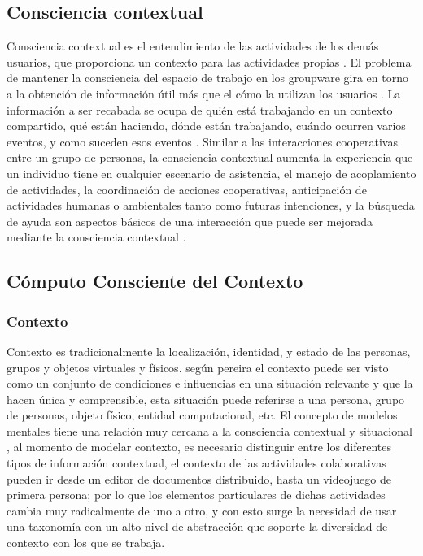 \subsection{Consciencia contextual}
Consciencia contextual es el entendimiento de las actividades de los dem\'as usuarios, que proporciona un contexto para las actividades propias \cite{dourish1992awareness}. El problema de mantener la consciencia del espacio de trabajo en los groupware gira en torno a la obtenci\'on de informaci\'on \'util m\'as que el c\'omo la utilizan los usuarios \cite{ardissono2012context}. La informaci\'on a ser recabada se ocupa de qui\'en est\'a trabajando en un contexto compartido, qu\'e est\'an haciendo, d\'onde est\'an trabajando, cu\'ando ocurren varios eventos, y como suceden esos eventos \cite{ardissono2012context}. Similar a las interacciones cooperativas entre un grupo de personas, la consciencia contextual aumenta la experiencia que un individuo tiene en cualquier escenario de asistencia, el manejo de acoplamiento de actividades, la coordinaci\'on de acciones cooperativas, anticipaci\'on de actividades humanas o ambientales tanto como futuras intenciones, y la b\'usqueda de ayuda son aspectos b\'asicos de una interacci\'on que puede ser mejorada mediante la consciencia contextual \cite{aehnelt2012discussion}.
\subsection{C\'omputo Consciente del Contexto}
\subsubsection{Contexto}
Contexto es tradicionalmente la localizaci\'on, identidad, y estado de las personas, grupos y objetos virtuales y f\'isicos. seg\'un pereira \cite{pereira2013CSCWD} el contexto puede ser visto como un conjunto de condiciones e influencias en una situaci\'on relevante y que la hacen \'unica y comprensible, esta situaci\'on puede referirse a una persona, grupo de personas, objeto f\'isico, entidad computacional, etc. El concepto de modelos mentales tiene una relaci\'on muy cercana a la consciencia contextual y situacional \cite{aehnelt2012discussion}, al momento de modelar contexto, es necesario distinguir entre los diferentes tipos de informaci\'on contextual\cite{hoyos2013domain}, el contexto de las actividades colaborativas pueden ir desde un editor de documentos distribuido, hasta un videojuego de primera persona; por lo que los elementos particulares de dichas actividades cambia muy radicalmente de uno a otro, y con esto surge la necesidad de usar una taxonom\'ia con un alto nivel de abstracci\'on que soporte la diversidad de contexto con los que se trabaja.


